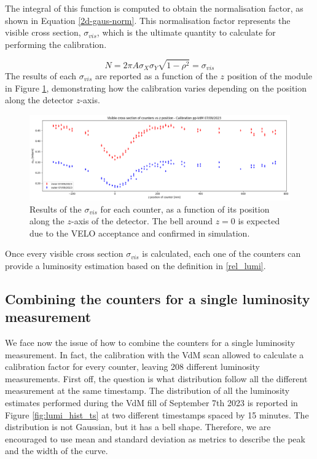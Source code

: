 The integral of this function is computed to obtain the normalisation factor, as shown in Equation \eqref{2d-gaus-norm}. This normalisation factor represents the visible cross section, $\sigma_{vis}$, which is the ultimate quantity to calculate for performing the calibration.

\begin{equation}
    N = 2\pi A \sigma_{X}\sigma_{Y}\sqrt {1-\rho ^{2}}=\sigma_{vis}\label{2d-gaus-norm}
\end{equation}
 The results of each $\sigma_{vis}$ are reported as a function of the $z$ position of the module in Figure \ref{fig:coefficient_pos}, demonstrating how the calibration varies depending on the position along the detector $z$-axis.

\begin{figure}
    \centering
    \includegraphics[width=\textwidth]{figures/coefficient_pos.png}
    \caption{Results of the $\sigma_{vis}$ for each counter, as a function of its position along the $z$-axis of the detector. The bell around $z=0$ is expected due to the VELO acceptance and confirmed in simulation.}
    \label{fig:coefficient_pos}
\end{figure}

Once every visible cross section $\sigma_{vis}$ is calculated, each one of the counters can provide a luminosity estimation based on the definition in \eqref{rel_lumi}.

\subsection{Combining the counters for a single luminosity measurement}
We face now the issue of how to combine the counters for a single luminosity measurement. In fact, the calibration with the VdM scan allowed to calculate a calibration factor for every counter, leaving 208 different luminosity measurements. 
First off, the question is what distribution follow all the different measurement at the same timestamp. 
The distribution of all the luminosity estimates performed during the VdM fill of September 7th 2023 is reported in Figure \ref{fig:lumi_hist_ts} at two different timestamps spaced by 15 minutes. The distribution is not Gaussian, but it has a bell shape. Therefore, we are encouraged to use mean and standard deviation as metrics to describe the peak and the width of the curve. 


